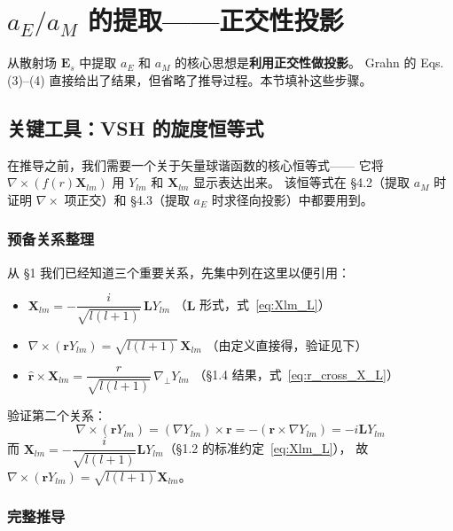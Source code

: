 \section{$a_E/a_M$ 的提取——正交性投影}

从散射场 $\mathbf{E}_s$ 中提取 $a_E$ 和 $a_M$ 的核心思想是\textbf{利用正交性做投影}。
Grahn 的 Eqs.(3)--(4) 直接给出了结果，但省略了推导过程。本节填补这些步骤。

\subsection{关键工具：VSH 的旋度恒等式}

在推导之前，我们需要一个关于矢量球谐函数的核心恒等式——
它将 $\nabla\times(f(r)\mathbf{X}_{lm})$ 用 $Y_{lm}$ 和 $\mathbf{X}_{lm}$ 显示表达出来。
该恒等式在 §4.2（提取 $a_M$ 时证明 $\nabla\times$ 项正交）和 §4.3（提取 $a_E$ 时求径向投影）中都要用到。

\subsubsection{预备关系整理}

从 §1 我们已经知道三个重要关系，先集中列在这里以便引用：

\begin{itemize}
  \item $\mathbf{X}_{lm} = -\dfrac{i}{\sqrt{l(l+1)}}\,\mathbf{L}Y_{lm}$ \hfill（$\mathbf{L}$ 形式，式~\ref{eq:Xlm_L}）
  \item $\nabla\times(\mathbf{r}Y_{lm}) = \sqrt{l(l+1)}\,\mathbf{X}_{lm}$ \hfill（由定义直接得，验证见下）
  \item $\hat{\mathbf{r}}\times\mathbf{X}_{lm} = \dfrac{r}{\sqrt{l(l+1)}}\,\nabla_\perp Y_{lm}$ \hfill（§1.4 结果，式~\ref{eq:r_cross_X_L}）
\end{itemize}

验证第二个关系：
$$
\nabla\times(\mathbf{r}Y_{lm}) = (\nabla Y_{lm})\times\mathbf{r}
= -(\mathbf{r}\times\nabla Y_{lm}) = -i\mathbf{L}Y_{lm}
$$
而 $\mathbf{X}_{lm} = -\dfrac{i}{\sqrt{l(l+1)}}\mathbf{L}Y_{lm}$（\S1.2 的标准约定~\ref{eq:Xlm_L}），
故 $\nabla\times(\mathbf{r}Y_{lm}) = \sqrt{l(l+1)}\mathbf{X}_{lm}$。

\subsubsection{完整推导}


